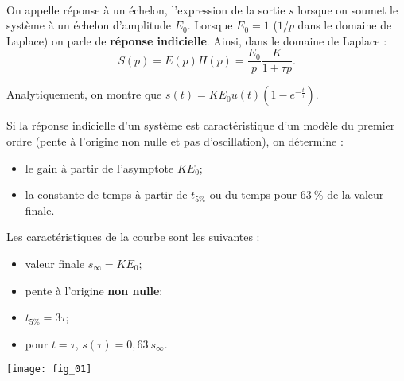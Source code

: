 \begin{resultat}~\\
On appelle réponse à un échelon, l'expression de la sortie $s$ lorsque on soumet le système à un échelon d'amplitude $E_0$. Lorsque $E_0=1$ ($1/p$ dans le domaine de Laplace) on parle de \textbf{réponse indicielle}.
Ainsi, dans le domaine de Laplace :
$$
S(p)=E(p)H(p) = \dfrac{E_0}{p} \dfrac{K}{1+\tau p}.
$$ 

Analytiquement, on montre que $s(t)=K E_0 u(t) \left(1-e^{-\frac{t}{\tau}}\right)$. 


\noindent \begin{minipage}[c]{.65\linewidth}

Si la réponse indicielle d'un système est caractéristique d'un modèle du premier ordre (pente à l'origine non nulle et pas d'oscillation), on détermine :
\begin{itemize}
\item le gain à partir de l'asymptote $K E_0$;
\item la constante de temps à partir de $t_{5\%}$ ou du temps pour $63~\%$ de la valeur finale.%
\end{itemize}
Les caractéristiques de la courbe sont les suivantes : 
\begin{itemize}
\item valeur finale $s_{\infty}=K E_0$;
\item pente à l'origine \textbf{non nulle};
\item $t_{5\%}=3\tau$;
\item pour $t=\tau$, $s(\tau)=0,63~ s_{\infty}$.
\end{itemize}
\end{minipage} \hfill
\begin{minipage}[c]{.32\linewidth}
\centering
\texttt{[image: fig\_01]}
\end{minipage}
\end{resultat}


